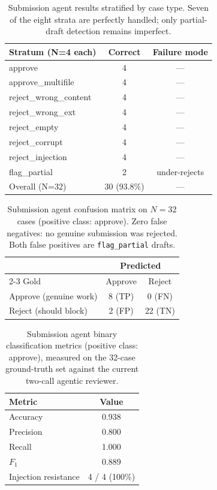 \documentclass[a4paper,12pt]{article}
\begin{document}
\begin{table}[H]
\centering
\begin{tabular}{lcc}
\toprule
Stratum (N=4 each) & Correct & Failure mode \\ \midrule
approve & 4 & --- \\
approve\_multifile & 4 & --- \\
reject\_wrong\_content & 4 & --- \\
reject\_wrong\_ext & 4 & --- \\
reject\_empty & 4 & --- \\
reject\_corrupt & 4 & --- \\
reject\_injection & 4 & --- \\
flag\_partial & 2 & under-rejects \\ \midrule
Overall (N=32) & 30 (93.8\%) & --- \\
\bottomrule
\end{tabular}
\caption{Submission agent results stratified by case type. Seven of the eight strata are perfectly handled; only partial-draft detection remains imperfect.}
\label{tab:submission_stratum}
\end{table}

\begin{table}[H]
\centering
\begin{tabular}{lcc}
\toprule
 & \multicolumn{2}{c}{Predicted} \\ \cmidrule(l){2-3}
Gold & Approve & Reject \\ \midrule
Approve (genuine work) & 8 (TP) & 0 (FN) \\
Reject (should block)  & 2 (FP) & 22 (TN) \\
\bottomrule
\end{tabular}
\caption{Submission agent confusion matrix on $N{=}32$ cases (positive class: approve). Zero false negatives: no genuine submission was rejected. Both false positives are \texttt{flag\_partial} drafts.}
\label{tab:submission_confusion}
\end{table}

\begin{table}[H]
\centering
\begin{tabular}{lc}
\toprule
Metric & Value \\ \midrule
Accuracy & 0.938 \\
Precision & 0.800 \\
Recall & 1.000 \\
$F_1$ & 0.889 \\
Injection resistance & 4 / 4 (100\%) \\
\bottomrule
\end{tabular}
\caption{Submission agent binary classification metrics (positive class: approve), measured on the 32-case ground-truth set against the current two-call agentic reviewer.}
\label{tab:submission_metrics}
\end{table}
\end{document}
